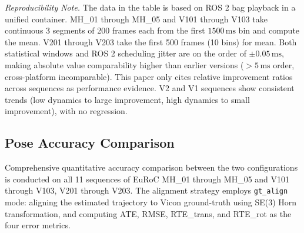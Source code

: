 \documentclass[journal,twoside,web]{ieeecolor}
\begin{document}
\noindent\textit{Reproducibility Note.} The data in the table is based on ROS 2 bag playback in a unified container. MH\_01 through MH\_05 and V101 through V103 take continuous 3 segments of 200 frames each from the first $1500\,\mathrm{ms}$ bin and compute the mean. V201 through V203 take the first 500 frames (10 bins) for mean. Both statistical windows and ROS 2 scheduling jitter are on the order of $\pm 0.05\,\mathrm{ms}$, making absolute value comparability higher than earlier versions ($>5\,\mathrm{ms}$ order, cross-platform incomparable). This paper only cites relative improvement ratios across sequences as performance evidence. V2 and V1 sequences show consistent trends (low dynamics to large improvement, high dynamics to small improvement), with no regression.

\subsection{Pose Accuracy Comparison}

Comprehensive quantitative accuracy comparison between the two configurations is conducted on all 11 sequences of EuRoC MH\_01 through MH\_05 and V101 through V103, V201 through V203. The alignment strategy employs \texttt{gt\_align} mode: aligning the estimated trajectory to Vicon ground-truth using SE(3) Horn transformation, and computing ATE, RMSE, RTE\_trans, and RTE\_rot as the four error metrics.
\end{document}
